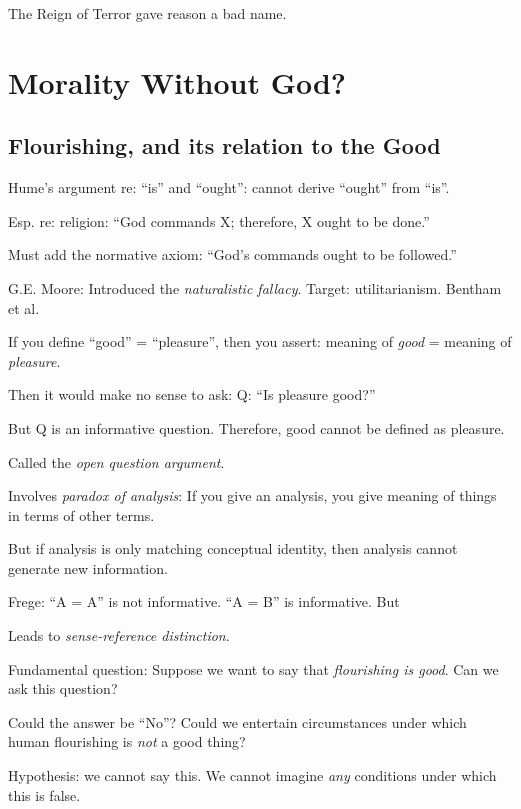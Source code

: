 \documentclass[
]{book}
\begin{document}
The Reign of Terror gave reason a bad name.

\hypertarget{morality-without-god}{%
\chapter{Morality Without God?}\label{morality-without-god}}

\hypertarget{flourishing-and-its-relation-to-the-good}{%
\section{Flourishing, and its relation to the Good}\label{flourishing-and-its-relation-to-the-good}}

Hume's argument re: ``is'' and ``ought'': cannot derive ``ought'' from ``is''.

Esp. re: religion: ``God commands X; therefore, X ought to be done.''

Must add the normative axiom: ``God's commands ought to be followed.''

G.E. Moore: Introduced the \emph{naturalistic fallacy}.
Target: utilitarianism. Bentham et al.

If you define ``good'' = ``pleasure'', then you assert: meaning of \emph{good} = meaning of \emph{pleasure}.

Then it would make no sense to ask:
Q: ``Is pleasure good?''

But Q is an informative question.
Therefore, good cannot be defined as pleasure.

Called the \emph{open question argument}.

Involves \emph{paradox of analysis}: If you give an analysis, you give meaning of things in terms of other terms.

But if analysis is only matching conceptual identity, then analysis cannot generate new information.

Frege: ``A = A'' is not informative. ``A = B'' is informative. But

Leads to \emph{sense-reference distinction}.

Fundamental question:
Suppose we want to say that \emph{flourishing is good}.
Can we ask this question?

Could the answer be ``No''?
Could we entertain circumstances under which human flourishing is \emph{not} a good thing?

Hypothesis: we cannot say this.
We cannot imagine \emph{any} conditions under which this is false.
\end{document}
